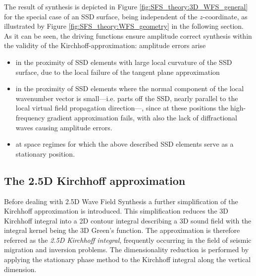 The result of synthesis is depicted in Figure \ref{fig:SFS_theory:3D_WFS_general} for the special case of an SSD surface, being independent of the $z$-coordinate, as illustrated by Figure \ref{fig:SFS_theory:WFS_geometry} in the following section.
As it can be seen, the driving functions ensure amplitude correct synthesis within the validity of the Kirchhoff-approximation:
amplitude errors arise 
\begin{itemize}
\item in the proximity of SSD elements with large local curvature of the SSD surface, due to the local failure of the tangent plane approximation
\item in the proximity of SSD elements where the normal component of the local wavenumber vector is small---i.e. parts off the SSD, nearly parallel to the local virtual field propagation direction---, since at these positions the high-frequency gradient approximation fails, with also the lack of diffractional waves causing amplitude errors.
\item at space regimes for which the above described SSD elements serve as a stationary position.
\end{itemize}

\subsection{The 2.5D Kirchhoff approximation}

Before dealing with 2.5D Wave Field Synthesis a further simplification of the Kirchhoff approximation is introduced.
This simplification reduces the 3D Kirchhoff integral into a 2D contour integral describing a 3D sound field with the integral kernel being the 3D Green's function.
The approximation is therefore referred as the \emph{2.5D Kirchhoff integral}, frequently occurring in the field of seismic migration and inversion problems.
The dimensionality reduction is performed by applying the stationary phase method to the Kirchhoff integral along the vertical dimension.

